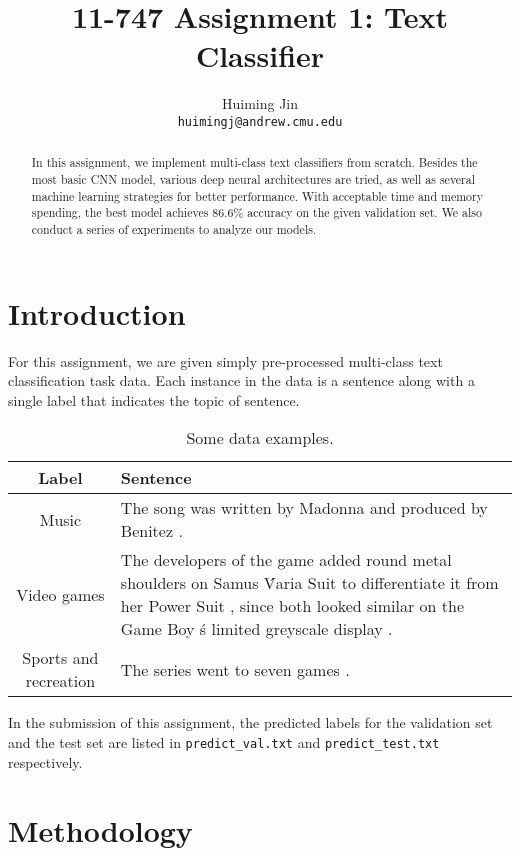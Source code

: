 \documentclass[11pt,letterpaper]{article}
\title{11-747 Assignment 1: Text Classifier}
\author{Huiming Jin \\ \texttt{huimingj@andrew.cmu.edu}}
\date{}
\begin{document}
\maketitle 
\begin{abstract}
    In this assignment, we implement multi-class text classifiers from scratch. 
    Besides the most basic CNN model, various deep neural architectures are 
    tried, as well as several machine learning strategies for better 
    performance. With acceptable time and memory spending, the best model 
    achieves 86.6\% accuracy on the given validation set. We also conduct a 
    series of experiments to analyze our models.
\end{abstract}

\section{Introduction}
    For this assignment, we are given simply pre-processed multi-class text
    classification task data. Each instance in the data is a sentence along with
    a single label that indicates the topic of sentence.

    \begin{table}[htbp]
        \centering
        \small
        \begin{tabular}{cp{4.3cm}}
            \toprule
                {\bf Label} & {\bf Sentence} \\
            \midrule
                Music       & The song was written by Madonna and produced by Benitez . \\
            \midrule
                Video games & The developers of the game added round metal shoulders on Samus \' Varia Suit to differentiate it from her Power Suit , since both looked similar on the Game Boy \'s limited greyscale display . \\
            \midrule
                Sports and recreation & The series went to seven games . \\
            \bottomrule
        \end{tabular}
        \caption{\label{tab:data-example} Some data examples.}
    \end{table}

    In the submission of this assignment, the predicted labels for the
    validation set and the test set are listed in \texttt{predict_val.txt} and 
    \texttt{predict_test.txt} respectively. 
    
\section{Methodology}
\end{document}
